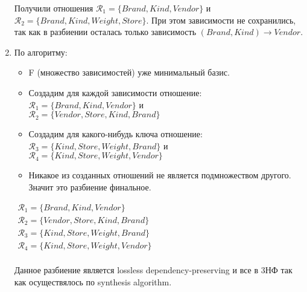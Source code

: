 \begin{solution}
\begin{enumerate}[label=\Alph*)]
\begin{itemize}
        \end{itemize}
        Получили отношения \( \mathcal{R}_1 = \{ Brand, Kind, Vendor \} \) и \( \mathcal{R}_2 = \{ Brand, Kind, Weight, Store \} \). При этом зависимости не сохранились, так как в разбиении осталась только зависимость \( (Brand, Kind) \to Vendor \).
        \item По алгоритму:
        \begin{itemize}
            \item F (множество зависимостей) уже минимальный базис.
            \item Создадим для каждой зависимости отношение: \( \mathcal{R}_1 = \{ Brand, Kind, Vendor \} \) и \\ \( \mathcal{R}_2 = \{ Vendor, Store, Kind, Brand \} \)
            \item Создадим для какого-нибудь ключа отношение: \( \mathcal{R}_3 = \{ Kind, Store, Weight, Brand \} \) и \\ \( \mathcal{R}_4 = \{ Kind, Store, Weight, Vendor \} \)
            \item Никакое из созданных отношений не является подмножеством другого. Значит это разбиение финальное.
        \end{itemize}
        \(\begin{array}{l}
            \mathcal{R}_1 = \{ Brand, Kind, Vendor \} \\
            \mathcal{R}_2 = \{ Vendor, Store, Kind, Brand \} \\
            \mathcal{R}_3 = \{ Kind, Store, Weight, Brand \} \\
            \mathcal{R}_4 = \{ Kind, Store, Weight, Vendor \}
        \end{array}\) \\\\
        Данное разбиение является lossless dependency-preserving и все в 3НФ так как осуществялось по synthesis algorithm.
    \end{enumerate}
\end{solution}